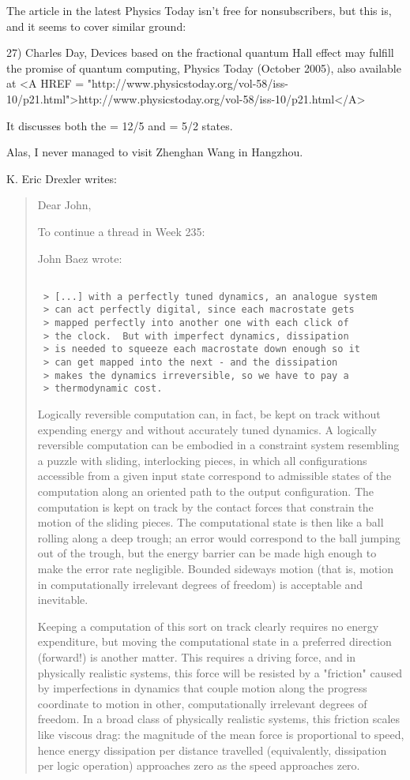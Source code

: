 The article in the latest Physics Today isn't free for nonsubscribers,
but this is, and it seems to cover similar ground:

27) Charles Day, Devices based on the fractional quantum Hall effect may
fulfill the promise of quantum computing, Physics Today (October 2005),
also available at <A HREF = "http://www.physicstoday.org/vol-58/iss-10/p21.html">http://www.physicstoday.org/vol-58/iss-10/p21.html</A>

It discusses both the \nu  = 12/5 and \nu  = 5/2 states.

Alas, I never managed to visit Zhenghan Wang in Hangzhou.

K. Eric Drexler writes:

\begin{quote}
Dear John,

To continue a thread in Week 235:

John Baez wrote:


\begin{verbatim}

 > [...] with a perfectly tuned dynamics, an analogue system 
 > can act perfectly digital, since each macrostate gets 
 > mapped perfectly into another one with each click of 
 > the clock.  But with imperfect dynamics, dissipation 
 > is needed to squeeze each macrostate down enough so it 
 > can get mapped into the next - and the dissipation 
 > makes the dynamics irreversible, so we have to pay a 
 > thermodynamic cost.  
\end{verbatim}
    

Logically reversible computation can, in fact, be kept on track  
without expending energy and without accurately tuned dynamics. A  
logically reversible computation can be embodied in a constraint  
system resembling a puzzle with sliding, interlocking pieces, in  
which all configurations accessible from a given input state  
correspond to admissible states of the computation along an oriented  
path to the output configuration. The computation is kept on track by  
the contact forces that constrain the motion of the sliding pieces.  
The computational state is then like a ball rolling along a deep  
trough; an error would correspond to the ball jumping out of the  
trough, but the energy barrier can be made high enough to make the  
error rate negligible. Bounded sideways motion (that is, motion in  
computationally irrelevant degrees of freedom) is acceptable and  
inevitable.

Keeping a computation of this sort on track clearly requires no  
energy expenditure, but moving the computational state in a preferred  
direction (forward!) is another matter. This requires a driving  
force, and in physically realistic systems, this force will be  
resisted by a "friction" caused by imperfections in dynamics that  
couple motion along the progress coordinate to motion in other,  
computationally irrelevant degrees of freedom. In a broad class of  
physically realistic systems, this friction scales like viscous drag:  
the magnitude of the mean force is proportional to speed, hence  
energy dissipation per distance travelled (equivalently, dissipation  
per logic operation) approaches zero as the speed approaches zero.


\end{quote}
